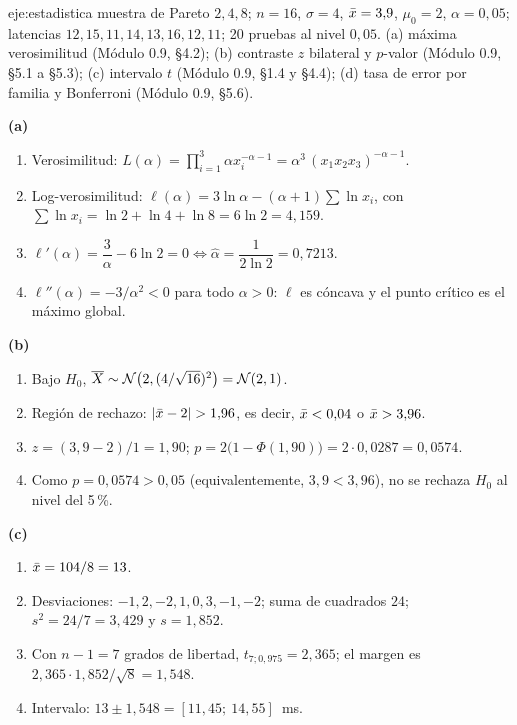 \begin{solucion}{eje:estadistica}
\datos muestra de Pareto $2,4,8$; $n=16$, $\sigma=4$, $\bar{x}=3{,}9$, $\mu_0=2$, $\alpha=0{,}05$; latencias $12,15,11,14,13,16,12,11$; 20 pruebas al nivel $0{,}05$.
\planteamiento (a) máxima verosimilitud (Módulo 0.9, §4.2); (b) contraste $z$ bilateral y $p$-valor (Módulo 0.9, §5.1 a §5.3); (c) intervalo $t$ (Módulo 0.9, §1.4 y §4.4); (d) tasa de error por familia y Bonferroni (Módulo 0.9, §5.6).
\pasos

\noindent\textbf{(a)}
\begin{enumerate}[label=\arabic*.]
  \item Verosimilitud: $L(\alpha)=\prod_{i=1}^{3}\alpha x_i^{-\alpha-1}=\alpha^{3}\,(x_1x_2x_3)^{-\alpha-1}$.
  \item Log-verosimilitud: $\ell(\alpha)=3\ln\alpha-(\alpha+1)\sum\ln x_i$, con $\sum\ln x_i=\ln2+\ln4+\ln8=6\ln2=4{,}159$.
  \item $\ell'(\alpha)=\dfrac3\alpha-6\ln2=0\iff\widehat\alpha=\dfrac{1}{2\ln2}=0{,}7213$.
  \item $\ell''(\alpha)=-3/\alpha^{2}<0$ para todo $\alpha>0$: $\ell$ es cóncava y el punto crítico es el máximo global.
\end{enumerate}

\noindent\textbf{(b)}
\begin{enumerate}[label=\arabic*.]
  \item Bajo $H_0$, $\overline{X}\sim\mathcal{N}\bigl(2,(4/\sqrt{16})^{2}\bigr)=\mathcal{N}(2,1)$.
  \item Región de rechazo: $\lvert\bar{x}-2\rvert>1{,}96$, es decir, $\bar{x}<0{,}04$ o $\bar{x}>3{,}96$.
  \item $z=(3{,}9-2)/1=1{,}90$; $p=2\bigl(1-\Phi(1{,}90)\bigr)=2\cdot0{,}0287=0{,}0574$.
  \item Como $p=0{,}0574>0{,}05$ (equivalentemente, $3{,}9<3{,}96$), no se rechaza $H_0$ al nivel del 5\,\%.
\end{enumerate}

\noindent\textbf{(c)}
\begin{enumerate}[label=\arabic*.]
  \item $\bar{x}=104/8=13$.
  \item Desviaciones: $-1,2,-2,1,0,3,-1,-2$; suma de cuadrados $24$; $s^{2}=24/7=3{,}429$ y $s=1{,}852$.
  \item Con $n-1=7$ grados de libertad, $t_{7;0{,}975}=2{,}365$; el margen es $2{,}365\cdot1{,}852/\sqrt8=1{,}548$.
  \item Intervalo: $13\pm1{,}548=[11{,}45;\ 14{,}55]$~ms.
\end{enumerate}


\end{solucion}
